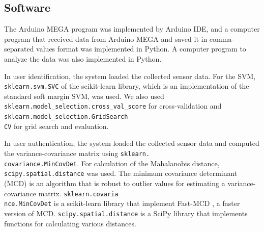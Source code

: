 \documentclass[sigchi,authordraft]{acmart}
\begin{document}
\subsection{Software}
The Arduino MEGA program was implemented by Arduino IDE, and a computer program that received data from Arduino MEGA and saved it in comma-separated values format was implemented in Python. A computer program to analyze the data was also implemented in Python.\par

In user identification, the system loaded the collected sensor data. For the SVM, \texttt{sklearn.svm.SVC} of the scikit-learn \cite{scikit-learn} library, which is an implementation of the standard soft margin SVM, was used. We also used \texttt{sklearn.model\_selection.cross\_val\_score} for cross-validation and \texttt{sklearn.model\_selection.GridSearch}\\\texttt{CV} for grid search and evaluation.\par

In user authentication, the system loaded the collected sensor data and computed the variance-covariance matrix using \texttt{sklearn.}\\\texttt{covariance.MinCovDet}. For calculation of the Mahalanobis distance, \texttt{scipy.spatial.distance} was used. The minimum covariance determinant (MCD) is an algorithm that is robust to outlier values for estimating a variance-covariance matrix. \texttt{sklearn.covaria}\\\texttt{nce.MinCovDet} is a scikit-learn library that implement Fast-MCD \cite{fast_mcd}, a faster version of MCD. \texttt{scipy.spatial.distance} is a SciPy \cite{scipy} library that implements functions for calculating various distances.




\end{document}
